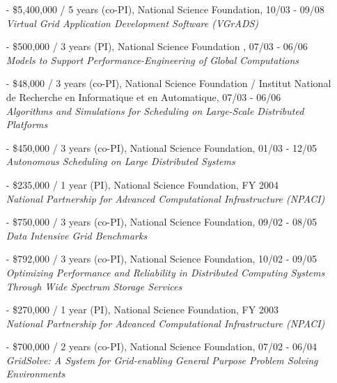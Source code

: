 \documentclass[times,11pt]{letter}
\begin{document}
\begin{itemize}
\item[-] \$5,400,000 / 5 years (co-PI), National Science Foundation, 10/03 - 09/08~\\
        {\it Virtual Grid Application Development Software (VGrADS)}

\item[-] \$500,000 / 3 years (PI), National Science Foundation , 07/03 - 06/06~\\
	{\it Models to Support Performance-Engineering of Global Computations}

\item[-] \$48,000 / 3 years (co-PI), National Science Foundation / Institut National de Recherche en Informatique et en Automatique, 07/03 - 06/06~\\
	{\it Algorithms and Simulations for Scheduling on Large-Scale Distributed Platforms}


\item[-] \$450,000 / 3 years (co-PI), National Science Foundation, 01/03 - 12/05~\\
	{\it Autonomous Scheduling on Large Distributed Systems}

\item[-] \$235,000 / 1 year (PI), National Science Foundation, FY 2004~\\
      \emph{National Partnership for Advanced Computational Infrastructure (NPACI)}


\item[-] \$750,000 / 3 years (co-PI), National Science Foundation, 09/02 - 08/05~\\
	{\it Data Intensive Grid Benchmarks}

\item[-] \$792,000 / 3 years (co-PI), National Science Foundation, 10/02 - 09/05~\\  
      {\it Optimizing Performance and Reliability in Distributed Computing Systems 
       Through Wide Spectrum Storage Services}

\item[-] \$270,000 / 1 year (PI), National Science Foundation, FY 2003~\\
      \emph{National Partnership for Advanced Computational Infrastructure (NPACI)}


\item[-] \$700,000 / 2 years (co-PI), National Science Foundation, 07/02 - 06/04~\\
      {\it GridSolve:  A System for Grid-enabling General Purpose Problem Solving Environments}


\end{itemize}
\end{document}
